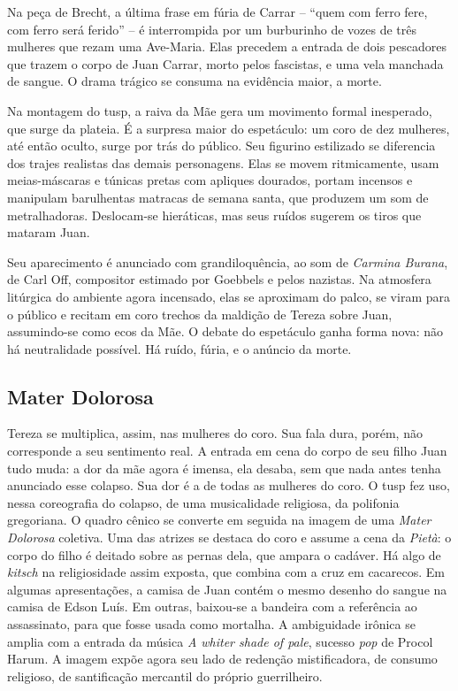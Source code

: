 Na peça de Brecht, a última frase em fúria de Carrar -- “quem com ferro
fere, com ferro será ferido” -- é interrompida por um burburinho de vozes
de três mulheres que rezam uma Ave-Maria. Elas precedem a entrada de
dois pescadores que trazem o corpo de Juan Carrar, morto pelos
fascistas, e uma vela manchada de sangue. O drama trágico se consuma na
evidência maior, a morte.

Na montagem do {\sc tusp}, a raiva da Mãe gera um movimento formal inesperado,
que surge da plateia. É a surpresa maior do espetáculo: um coro de dez
mulheres, até então oculto, surge por trás do público. Seu figurino
estilizado se diferencia dos trajes realistas das demais personagens.
Elas se movem ritmicamente, usam meias-máscaras e túnicas pretas com
apliques dourados, portam incensos e manipulam barulhentas matracas de
semana santa, que produzem um som de metralhadoras. Deslocam-se
hieráticas, mas seus ruídos sugerem os tiros que mataram Juan.

Seu aparecimento é anunciado com grandiloquência, ao som de {\it Carmina
Burana}, de Carl Off, compositor estimado por Goebbels e pelos nazistas.
Na atmosfera litúrgica do ambiente agora incensado, elas se aproximam do
palco, se viram para o público e recitam em coro trechos da maldição de
Tereza sobre Juan, assumindo-se como ecos da Mãe. O debate do espetáculo
ganha forma nova: não há neutralidade possível. Há ruído, fúria, e o
anúncio da morte.


\subsection{Mater Dolorosa}

Tereza se multiplica, assim, nas mulheres do coro. Sua fala dura, porém,
não corresponde a seu sentimento real. A entrada em cena do corpo de seu
filho Juan tudo muda: a dor da mãe agora é imensa, ela desaba, sem que
nada antes tenha anunciado esse colapso. Sua dor é a de todas as
mulheres do coro. O {\sc tusp} fez uso, nessa coreografia do colapso, de uma
musicalidade religiosa, da polifonia gregoriana. O quadro cênico se
converte em seguida na imagem de uma {\it Mater Dolorosa} coletiva. Uma
das atrizes se destaca do coro e assume a cena da {\it Pietà}: o corpo
do filho é deitado sobre as pernas dela, que ampara o cadáver. Há algo
de {\it kitsch} na religiosidade assim exposta, que combina com a cruz
em cacarecos. Em algumas apresentações, a camisa de Juan contém o mesmo
desenho do sangue na camisa de Edson Luís. Em outras, baixou-se a
bandeira com a referência ao assassinato, para que fosse usada como
mortalha. A ambiguidade irônica se amplia com a entrada da música {\it A
whiter shade of pale}, sucesso {\it pop} de Procol Harum. A imagem expõe
agora seu lado de redenção mistificadora, de consumo religioso, de
santificação mercantil do próprio guerrilheiro.

